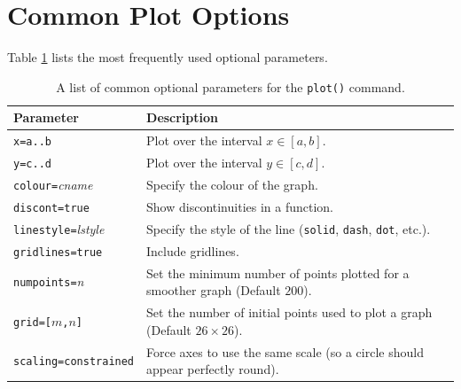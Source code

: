 \section{Common Plot Options}

Table \ref{tbl:plot_options} lists the most frequently used optional parameters.

\begin{table}
\label{tbl:plot_options}
\centering
\begin{tabular}{lp{2.5in}}
\hline
Parameter & Description\\
\hline
\texttt{x=a..b}						& Plot over the interval $x\in[a,b]$.
    \index{plot!axes intervals}
    \\
\texttt{y=c..d}						& Plot over the interval $y\in[c,d]$.
    \index{plot!axes intervals}
    \\
\texttt{colour=}\textit{cname}		& Specify the colour of the graph.
    \index{plot!colours}
    \\
\texttt{discont=true}				& Show discontinuities in a function.
    \index{plot!axes intervals}
    \index{plot!discontinuities}
    \\
\texttt{linestyle=}\textit{lstyle}	& Specify the style of the line (\texttt{solid}, \texttt{dash}, \texttt{dot}, etc.).
    \index{plot!line style}
    \\
\texttt{gridlines=true}				& Include gridlines.
    \index{plot!gridlines}
    \\
\texttt{numpoints=}\textit{n}		& Set the minimum number of points plotted for a smoother graph (Default $200$).
    \index{plot!plot resolution}
    \\
\texttt{grid=[$m$,$n$]}				& Set the number of initial points used to plot a graph (Default $26 \times 26$).
    \index{plot!plot resolution}
    \\
\texttt{scaling=constrained}		& Force axes to use the same scale (so a circle should appear perfectly round).
    \index{plot!scaling}
    \\
\hline
\end{tabular}
\caption{A list of common optional parameters for the \texttt{plot()} command.}
\end{table}

